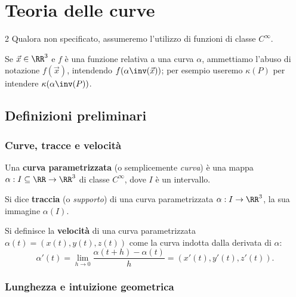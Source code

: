 \chapter{Teoria delle curve}
\setlength{\parindent}{2pt}

\begin{multicols*}{2}
    Qualora non specificato, assumeremo l'utilizzo di funzioni di classe $C^\infty$. \smallskip

    Se $\vec{x} \in \RR^3$ e $f$ è una funzione relativa a una curva $\alpha$, ammettiamo l'abuso di notazione
    $f(\vec{x})$, intendendo $f(\alpha\inv(\vec{x}))$; per esempio useremo $\kappa(P)$ per intendere $\kappa(\alpha\inv(P))$.

    \section{Definizioni preliminari}

    \subsection{Curve, tracce e velocità}

    \begin{definition}
        Una \textbf{curva parametrizzata} (o semplicemente \textit{curva})
        è una mappa $\alpha : I \subseteq \RR \to \RR^3$
        di classe $C^\infty$, dove $I$ è un intervallo.
    \end{definition}

    \begin{definition}
        Si dice \textbf{traccia} (o \textit{supporto}) di una curva
        parametrizzata $\alpha : I \to \RR^3$, la sua immagine $\alpha(I)$.
    \end{definition}

    \begin{definition}
        Si definisce la \textbf{velocità} di una curva parametrizzata
        $\alpha(t) = (x(t), y(t), z(t))$ come la curva indotta dalla derivata di $\alpha$:
        \[ \alpha'(t) = \lim_{h \to 0} \frac{\alpha(t + h) - \alpha(t)}{h} = (x'(t), y'(t), z'(t)). \]
    \end{definition}

    \subsection{Lunghezza e intuizione geometrica}


\end{multicols*}
